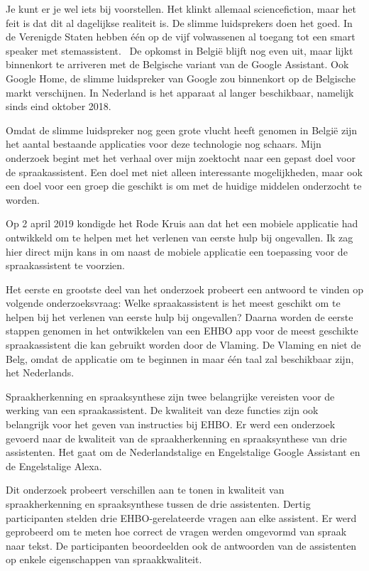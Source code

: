 Je kunt er je wel iets bij voorstellen. Het klinkt allemaal sciencefiction, maar het feit is dat dit al dagelijkse realiteit is. De slimme luidsprekers doen het goed. In de Verenigde Staten hebben één op de vijf volwassenen al toegang tot een smart speaker met stemassistent.~\autocite{Passies2018} De opkomst in België blijft nog even uit, maar lijkt binnenkort te arriveren met de Belgische variant van de Google Assistant. Ook Google Home, de slimme luidspreker van Google zou binnenkort op de Belgische markt verschijnen. In Nederland is het apparaat al langer beschikbaar, namelijk sinds eind oktober 2018.~\autocite{Haenen2018}

Omdat de slimme luidspreker nog geen grote vlucht heeft genomen in België zijn het aantal bestaande applicaties voor deze technologie nog schaars. Mijn onderzoek begint met het verhaal over mijn zoektocht naar een gepast doel voor de spraakassistent. Een doel met niet alleen interessante mogelijkheden, maar ook een doel voor een groep die geschikt is om met de huidige middelen onderzocht te worden.

Op 2 april 2019 kondigde het Rode Kruis aan dat het een mobiele applicatie had ontwikkeld om te helpen met het verlenen van eerste hulp bij ongevallen. Ik zag hier direct mijn kans in om naast de mobiele applicatie een toepassing voor de spraakassistent te voorzien.

Het eerste en grootste deel van het onderzoek probeert een antwoord te vinden op volgende onderzoeksvraag: Welke spraakassistent is het meest geschikt om te helpen bij het verlenen van eerste hulp bij ongevallen? Daarna worden de eerste stappen genomen in het ontwikkelen van een EHBO app voor de meest geschikte spraakassistent die kan gebruikt worden door de Vlaming. De Vlaming en niet de Belg, omdat de applicatie om te beginnen in maar één taal zal beschikbaar zijn, het Nederlands.

Spraakherkenning en spraaksynthese zijn twee belangrijke vereisten voor de werking van een spraakassistent. De kwaliteit van deze functies zijn ook belangrijk voor het geven van instructies bij EHBO. Er werd een onderzoek gevoerd naar de kwaliteit van de spraakherkenning en spraaksynthese van drie assistenten. Het gaat om de Nederlandstalige en Engelstalige Google Assistant en de Engelstalige Alexa.

Dit onderzoek probeert verschillen aan te tonen in kwaliteit van spraakherkenning en spraaksynthese tussen de drie assistenten. Dertig participanten stelden drie EHBO-gerelateerde vragen aan elke assistent. Er werd geprobeerd om te meten hoe correct de vragen werden omgevormd van spraak naar tekst. De participanten beoordeelden ook de antwoorden van de assistenten op enkele eigenschappen van spraakkwaliteit.

